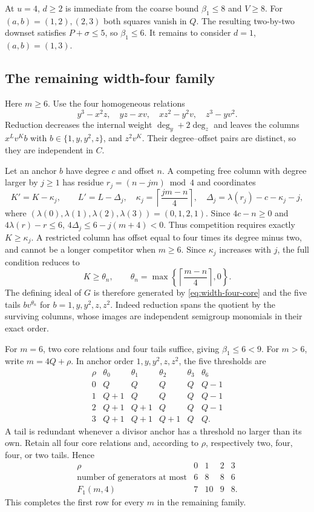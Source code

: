 At $u=4$, $d\ge2$ is immediate from the coarse bound $\beta_1\le8$
and $V\ge8$.  For $(a,b)=(1,2),(2,3)$ both squares vanish in $Q$.
The resulting two-by-two downset satisfies $P+\sigma\le5$, so
$\beta_1\le6$.  It remains to consider $d=1$, $(a,b)=(1,3)$.

\subsection{The remaining width-four family}

Here $m\ge6$.  Use the four homogeneous relations
\begin{equation}\label{eq:width-four-core}
 y^3-x^2z,\quad yz-xv,\quad xz^2-y^2v,\quad z^3-yv^2.
\end{equation}
Reduction decreases the internal weight $\deg_y+2\deg_z$ and leaves
the columns $x^Lv^Kb$ with $b\in\{1,y,y^2,z\}$, and $z^2v^K$.
Their degree--offset pairs are distinct, so they are independent in $C$.

Let an anchor $b$ have degree $c$ and offset $n$.
A competing free column with degree larger by $j\ge1$ has residue
$r_j=(n-jm)\bmod4$ and coordinates
\[
 K'=K-\kappa_j,\qquad L'=L-\Delta_j,\quad
 \kappa_j=\left\lceil\frac{jm-n}{4}\right\rceil,\quad
 \Delta_j=\lambda(r_j)-c-\kappa_j-j,
\]
where $(\lambda(0),\lambda(1),\lambda(2),\lambda(3))=(0,1,2,1)$.
Since $4c-n\ge0$ and $4\lambda(r)-r\le6$,
$4\Delta_j\le6-j(m+4)<0$.
Thus competition requires exactly $K\ge\kappa_j$.
A restricted column has offset equal to four times its degree minus
two, and cannot be a longer competitor when $m\ge6$.
Since $\kappa_j$ increases with $j$, the full condition reduces to
\[
 K\ge\theta_n,\qquad
 \theta_n=\max\left\{\left\lceil\frac{m-n}{4}\right\rceil,0\right\}.
\]
The defining ideal of $G$ is therefore generated by
\eqref{eq:width-four-core} and the five tails
$bv^{\theta_n}$ for $b=1,y,y^2,z,z^2$.
Indeed reduction spans the quotient by the surviving columns, whose
images are independent semigroup monomials in their exact order.

For $m=6$, two core relations and four tails suffice, giving
$\beta_1\le6<9$.
For $m>6$, write $m=4Q+\rho$.  In anchor order $1,y,y^2,z,z^2$,
the five thresholds are
\[
\begin{array}{c|ccccc}
 \rho&\theta_0&\theta_1&\theta_2&\theta_3&\theta_6\\\hline
 0&Q&Q&Q&Q&Q-1\\
 1&Q+1&Q&Q&Q&Q-1\\
 2&Q+1&Q+1&Q&Q&Q-1\\
 3&Q+1&Q+1&Q+1&Q&Q.
\end{array}
\]
A tail is redundant whenever a divisor anchor has a threshold no
larger than its own.  Retain all four core relations and, according to
$\rho$, respectively two, four, four, or two tails.  Hence
\[
\begin{array}{c|rrrr}
 \rho&0&1&2&3\\\hline
 \text{number of generators at most}&6&8&8&6\\
 F_1(m,4)&7&10&9&8.
\end{array}
\]
This completes the first row for every $m$ in the remaining family.

